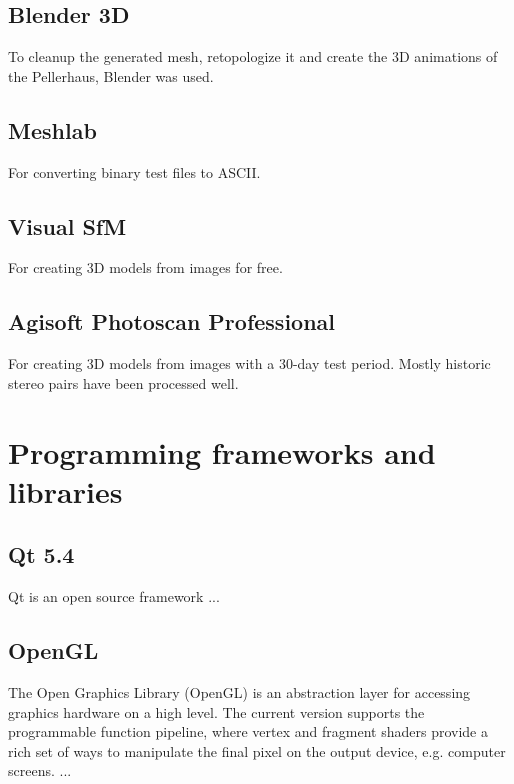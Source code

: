 \subsection{Blender 3D}
To cleanup the generated mesh, retopologize it and create the 3D animations of the Pellerhaus, Blender was used.

\subsection{Meshlab}
For converting binary test files to ASCII.

\subsection{Visual SfM}
For creating 3D models from images for free.

\subsection{Agisoft Photoscan Professional}
For creating 3D models from images with a 30-day test period. Mostly historic stereo pairs have been processed well.

\section{Programming frameworks and libraries}

\subsection{Qt 5.4}

Qt is an open source framework ...

\subsection{OpenGL}

The Open Graphics Library (OpenGL) is an abstraction layer for accessing graphics hardware on a high level. The current version supports the programmable function pipeline, where vertex and fragment shaders provide a rich set of ways to manipulate the final pixel on the output device, e.g. computer screens. ...


